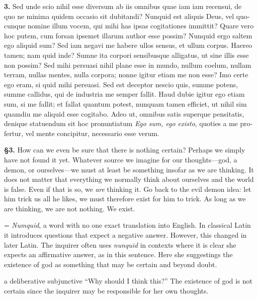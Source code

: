 
\clearpage

\beginnumbering
\pstart
\begin{latin}
    \textenglish{\textbf{3.}} Sed unde scio nihil esse diversum ab iis omnibus quae iam iam recensui, de quo ne minima quidem occasio sit dubitandi? Nunquid est aliquis Deus, vel quocunque nomine illum vocem, qui mihi has ipsas cogitationes immittit? Quare vero hoc putem, cum forsan ipsemet illarum author esse possim? Nunquid ergo saltem ego aliquid sum? Sed iam negavi me habere ullos sensus, et ullum corpus. Haereo tamen; nam quid  inde? Sumne ita corpori sensibusque alligatus, ut sine illis esse non possim? Sed mihi persuasi nihil plane esse in mundo, nullum coelum, nullam terram, nullas mentes, nulla corpora; nonne igitur etiam me non esse? Imo certe ego eram, si quid mihi persuasi. Sed est deceptor nescio quis, summe potens, summe callidus, qui de industria me semper fallit. Haud dubie igitur ego etiam sum, si me fallit; et fallat quantum potest, nunquam tamen efficiet, ut nihil sim quamdiu me aliquid esse cogitabo. Adeo ut, omnibus satis superque pensitatis, denique statuendum sit hoc pronuntiatum \textit{Ego sum, ego existo}, quoties a me profertur, vel mente concipitur, necessario esse verum.
\end{latin}
\pend
\endnumbering

\prenotes

\textbf{§3.} How can we even be sure that there is nothing certain? Perhaps we simply have not found it yet. Whatever source we imagine for our thoughts---god, a demon, or ourselves---we must at least be something insofar as we are thinking. It does not matter that everything we normally think about ourselves and the world is false. Even if that is so, we \textit{are} thinking it. Go back to the evil demon idea: let him trick us all he likes, we must therefore exist for him to trick. As long as we are thinking, we are not nothing. We exist.

 = \textit{Numquid}, a word with no one exact translation into English. In classical Latin it introduces questions that expect a negative answer. However, this changed in later Latin. The inquirer often uses \textit{nunquid} in contexts where it is clear she expects an affirmative answer, as in this sentence. Here she suggestings the existence of god as something that may be certain and beyond doubt.

 a deliberative subjunctive ``Why should I think this?'' The existence of god is not certain since the inquirer may be responsible for her own thoughts.

